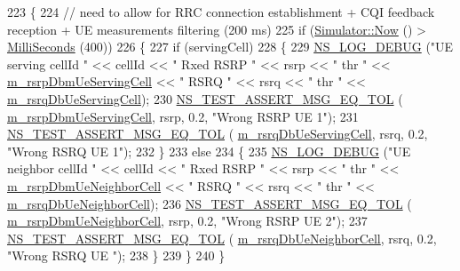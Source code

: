 \begin{DoxyCode}
223 \{
224   \textcolor{comment}{// need to allow for RRC connection establishment + CQI feedback reception + UE measurements filtering
       (200 ms)}
225   \textcolor{keywordflow}{if} (\hyperlink{group__simulator_gac3635e2e87f7ce316c89290ee1b01d0d}{Simulator::Now} () > \hyperlink{group__timecivil_gaf26127cf4571146b83a92ee18679c7a9}{MilliSeconds} (400))
226     \{
227       \textcolor{keywordflow}{if} (servingCell)
228         \{
229           \hyperlink{group__logging_ga413f1886406d49f59a6a0a89b77b4d0a}{NS\_LOG\_DEBUG} (\textcolor{stringliteral}{"UE serving cellId "} << cellId << \textcolor{stringliteral}{" Rxed RSRP "} << rsrp << \textcolor{stringliteral}{" thr "} << 
      \hyperlink{classLteUeMeasurementsTestCase_a5afd5051a96e8cd850511637ad12aa1d}{m\_rsrpDbmUeServingCell} << \textcolor{stringliteral}{" RSRQ "} << rsrq << \textcolor{stringliteral}{" thr "} << 
      \hyperlink{classLteUeMeasurementsTestCase_a4f5cb7b7b1948192712b9df5cbba1e0b}{m\_rsrqDbUeServingCell});
230           \hyperlink{group__testing_ga9e7861b56b4e70db3b56044cb7a28e41}{NS\_TEST\_ASSERT\_MSG\_EQ\_TOL} (
      \hyperlink{classLteUeMeasurementsTestCase_a5afd5051a96e8cd850511637ad12aa1d}{m\_rsrpDbmUeServingCell}, rsrp, 0.2, \textcolor{stringliteral}{"Wrong RSRP UE 1"});
231           \hyperlink{group__testing_ga9e7861b56b4e70db3b56044cb7a28e41}{NS\_TEST\_ASSERT\_MSG\_EQ\_TOL} (
      \hyperlink{classLteUeMeasurementsTestCase_a4f5cb7b7b1948192712b9df5cbba1e0b}{m\_rsrqDbUeServingCell}, rsrq, 0.2, \textcolor{stringliteral}{"Wrong RSRQ UE 1"});
232         \}
233       \textcolor{keywordflow}{else}
234         \{
235           \hyperlink{group__logging_ga413f1886406d49f59a6a0a89b77b4d0a}{NS\_LOG\_DEBUG} (\textcolor{stringliteral}{"UE neighbor cellId "} << cellId << \textcolor{stringliteral}{" Rxed RSRP "} << rsrp << \textcolor{stringliteral}{" thr "} << 
      \hyperlink{classLteUeMeasurementsTestCase_ae051cd902447ea3daf948f65718ca4b4}{m\_rsrpDbmUeNeighborCell} << \textcolor{stringliteral}{" RSRQ "} << rsrq << \textcolor{stringliteral}{" thr "} << 
      \hyperlink{classLteUeMeasurementsTestCase_ac11f0c198f29818957516ebfe9c5853b}{m\_rsrqDbUeNeighborCell});
236           \hyperlink{group__testing_ga9e7861b56b4e70db3b56044cb7a28e41}{NS\_TEST\_ASSERT\_MSG\_EQ\_TOL} (
      \hyperlink{classLteUeMeasurementsTestCase_ae051cd902447ea3daf948f65718ca4b4}{m\_rsrpDbmUeNeighborCell}, rsrp, 0.2, \textcolor{stringliteral}{"Wrong RSRP UE 2"});
237           \hyperlink{group__testing_ga9e7861b56b4e70db3b56044cb7a28e41}{NS\_TEST\_ASSERT\_MSG\_EQ\_TOL} (
      \hyperlink{classLteUeMeasurementsTestCase_ac11f0c198f29818957516ebfe9c5853b}{m\_rsrqDbUeNeighborCell}, rsrq, 0.2, \textcolor{stringliteral}{"Wrong RSRQ UE "});
238         \}
239     \}
240 \}
\end{DoxyCode}


